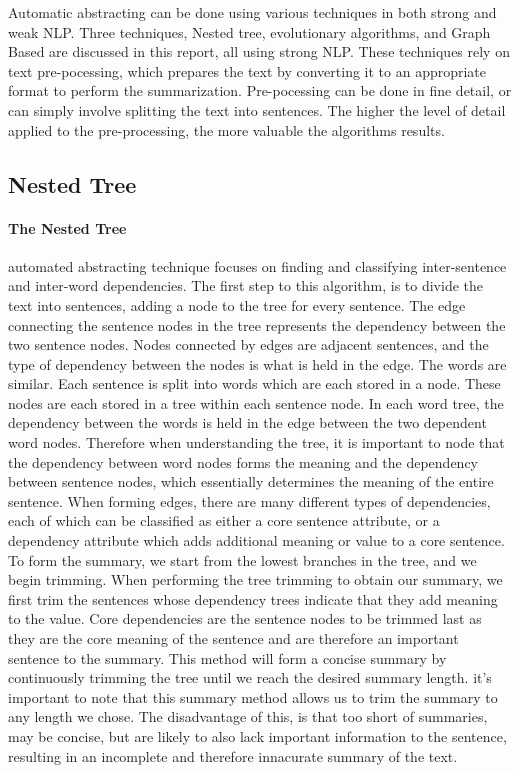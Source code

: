 
Automatic abstracting can be done using various techniques in both strong and weak NLP. Three techniques, Nested tree, evolutionary algorithms, and Graph Based are discussed in this report, all using strong NLP. These techniques rely on text pre-pocessing, which prepares the text by converting it to an appropriate format to perform the summarization. Pre-pocessing can be done in fine detail, or can simply involve splitting the text into sentences. The higher the level of detail applied to the pre-processing, the more valuable the algorithms results.


\subsection{Nested Tree}

	\paragraph{The Nested Tree} automated abstracting technique focuses on finding and classifying inter-sentence and inter-word dependencies. The first step to this algorithm, is to divide the text into sentences, adding a node to the tree for every sentence. The edge connecting the sentence nodes in the tree represents the dependency between the two sentence nodes. Nodes connected by edges are adjacent sentences, and the type of dependency between the nodes is what is held in the edge. The words are similar. Each sentence is split into words which are each stored in a node. These nodes are each stored in a tree within each sentence node. In each word tree, the dependency between the words is held in the edge between the two dependent word nodes. Therefore when understanding the tree, it is important to node that the dependency between word nodes forms the meaning and the dependency between sentence nodes, which essentially determines the meaning of the entire sentence. When forming edges, there are many different types of dependencies, each of which can be classified as either a core sentence attribute, or a dependency attribute which adds additional meaning or value to a core sentence. To form the summary, we start from the lowest branches in the tree, and we begin trimming. When performing the tree trimming to obtain our summary, we first trim the sentences whose dependency trees indicate that they add meaning to the value. Core dependencies are the sentence nodes to be trimmed last as they are the core meaning of the sentence and are therefore an important sentence to the summary. This method will form a concise summary by continuously trimming the tree until we reach the desired summary length. it's important to note that this summary method allows us to trim the summary to any length we chose. The disadvantage of this, is that too short of summaries, may be concise, but are likely to also lack important information to the sentence, resulting in an incomplete and therefore innacurate summary of the text. 


